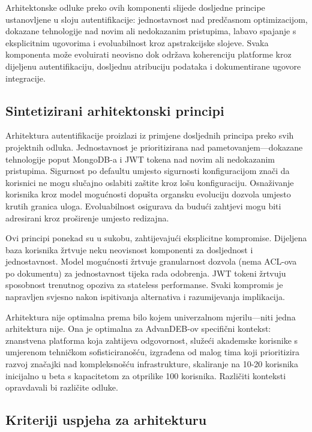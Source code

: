 \documentclass[12pt,a4paper]{article}
\begin{document}
Arhitektonske odluke preko ovih komponenti slijede dosljedne principe ustanovljene u sloju autentifikacije: jednostavnost nad predčasnom optimizacijom, dokazane tehnologije nad novim ali nedokazanim pristupima, labavo spajanje s eksplicitnim ugovorima i evoluabilnost kroz apstrakcijske slojeve. Svaka komponenta može evoluirati neovisno dok održava koherenciju platforme kroz dijeljenu autentifikaciju, dosljednu atribuciju podataka i dokumentirane ugovore integracije.

\subsection{Sintetizirani arhitektonski principi}

Arhitektura autentifikacije proizlazi iz primjene dosljednih principa preko svih projektnih odluka. Jednostavnost je prioritizirana nad pametovanjem—dokazane tehnologije poput MongoDB-a i JWT tokena nad novim ali nedokazanim pristupima. Sigurnost po defaultu umjesto sigurnosti konfiguracijom znači da korisnici ne mogu slučajno oslabiti zaštite kroz lošu konfiguraciju. Osnaživanje korisnika kroz model mogućnosti dopušta organsku evoluciju dozvola umjesto krutih granica uloga. Evoluabilnost osigurava da budući zahtjevi mogu biti adresirani kroz proširenje umjesto redizajna.

Ovi principi ponekad su u sukobu, zahtijevajući eksplicitne kompromise. Dijeljena baza korisnika žrtvuje neku neovisnost komponenti za dosljednost i jednostavnost. Model mogućnosti žrtvuje granularnost dozvola (nema ACL-ova po dokumentu) za jednostavnost tijeka rada odobrenja. JWT tokeni žrtvuju sposobnost trenutnog opoziva za stateless performanse. Svaki kompromis je napravljen svjesno nakon ispitivanja alternativa i razumijevanja implikacija.

Arhitektura nije optimalna prema bilo kojem univerzalnom mjerilu—niti jedna arhitektura nije. Ona je optimalna za AdvanDEB-ov specifični kontekst: znanstvena platforma koja zahtijeva odgovornost, služeći akademske korisnike s umjerenom tehničkom sofisticiranošću, izgrađena od malog tima koji prioritizira razvoj značajki nad kompleksnošću infrastrukture, skaliranje na 10-20 korisnika inicijalno u beta s kapacitetom za otprilike 100 korisnika. Različiti konteksti opravdavali bi različite odluke.

\subsection{Kriteriji uspjeha za arhitekturu}
\end{document}
